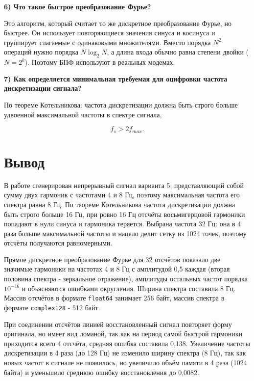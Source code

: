 \documentclass[a4paper,14pt,oneside,openany]{memoir}
\begin{document}
\textbf{6) Что такое быстрое преобразование Фурье?}

Это алгоритм, который считает то же дискретное преобразование Фурье, но быстрее. Он использует повторяющиеся значения синуса и косинуса и группирует слагаемые с одинаковыми множителями. Вместо порядка $N^2$ операций нужно порядка $N \log_2 N$, а длина входа обычно равна степени двойки ($N = 2^k$). Поэтому БПФ используют в реальных модемах.

\textbf{7) Как определяется минимальная требуемая для оцифровки частота дискретизации сигнала?}

По теореме Котельникова: частота дискретизации должна быть строго больше удвоенной максимальной частоты в спектре сигнала,

\begin{equation*}
f_s > 2 f_{max}.
\end{equation*}


\section{Вывод}

В работе сгенерирован непрерывный сигнал варианта 5, представляющий собой сумму двух гармоник с частотами 4 и 8 Гц, поэтому максимальная частота его спектра равна 8 Гц. По теореме Котельникова частота дискретизации должна быть строго больше 16 Гц, при ровно 16 Гц отсчёты восьмигерцовой гармоники попадают в нули синуса и гармоника теряется. Выбрана частота 32 Гц: она в 4 раза больше максимальной частоты и нацело делит сетку из 1024 точек, поэтому отсчёты получаются равномерными.

Прямое дискретное преобразование Фурье для 32 отсчётов показало две значимые гармоники на частотах 4 и 8 Гц с амплитудой 0,5 каждая (вторая половина спектра - зеркальное отражение), амплитуды остальных частот порядка $10^{-16}$ и объясняются ошибками округления. Ширина спектра составила 8 Гц. Массив отсчётов в формате \texttt{float64} занимает 256 байт, массив спектра в формате \texttt{complex128} - 512 байт.

При соединении отсчётов линией восстановленный сигнал повторяет форму оригинала, но имеет вид ломаной, так как на период самой быстрой гармоники приходится всего 4 отсчёта, средняя ошибка составила 0,138. Увеличение частоты дискретизации в 4 раза (до 128 Гц) не изменило ширину спектра (8 Гц), так как новых частот в сигнале не появилось, но увеличило объём памяти в 4 раза (1024 байта) и уменьшило среднюю ошибку восстановления до 0,0082.
\end{document}

